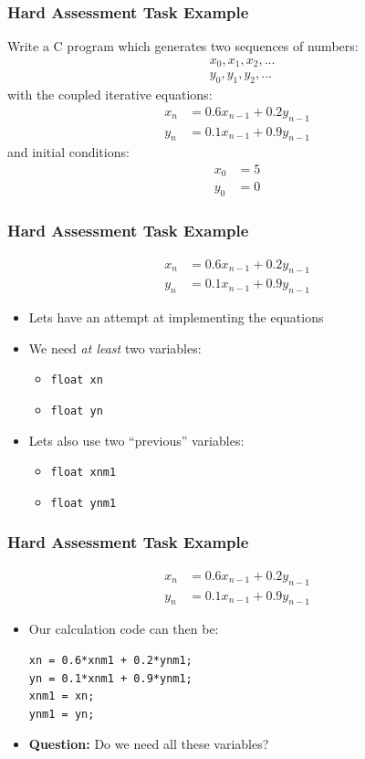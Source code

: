 \documentclass[14pt]{beamer}
\begin{document}
\begin{frame}[fragile]
\frametitle{Hard Assessment Task Example}
{\small Write a C program which generates two sequences of numbers:
\begin{align*}
& x_0, x_1, x_2, ...\\
& y_0, y_1, y_2, ...
\end{align*}
with the coupled iterative equations:
\begin{align*}
x_n &= 0.6x_{n-1} + 0.2y_{n-1}\\
y_n &= 0.1x_{n-1} + 0.9y_{n-1}
\end{align*}
and initial conditions:
\begin{align*}
x_0 &= 5\\
y_0 &= 0
\end{align*}
}
\end{frame}

\begin{frame}
\frametitle{Hard Assessment Task Example}
\begin{align*}
x_n &= 0.6x_{n-1} + 0.2y_{n-1}\\
y_n &= 0.1x_{n-1} + 0.9y_{n-1}
\end{align*}
\vspace{-6mm}
\begin{itemize}
\item Lets have an attempt at implementing the equations
\item We need \textit{at least} two variables:
	\begin{itemize}
		\item \texttt{float xn}
		\item \texttt{float yn}
	\end{itemize}
\item Lets also use two ``previous'' variables:
	\begin{itemize}
		\item \texttt{float xnm1}
		\item \texttt{float ynm1}
	\end{itemize}	
\end{itemize}
\end{frame}

\begin{frame}[fragile]
\frametitle{Hard Assessment Task Example}
\begin{align*}
x_n &= 0.6x_{n-1} + 0.2y_{n-1}\\
y_n &= 0.1x_{n-1} + 0.9y_{n-1}
\end{align*}
\vspace{-6mm}
\begin{itemize}
\item Our calculation code can then be:
\begin{lstlisting}[style=CStyle]
xn = 0.6*xnm1 + 0.2*ynm1;
yn = 0.1*xnm1 + 0.9*ynm1;
xnm1 = xn;
ynm1 = yn;
\end{lstlisting}
\item \textbf{Question:} Do we need all these variables?
\end{itemize}
\end{frame}
\end{document}
